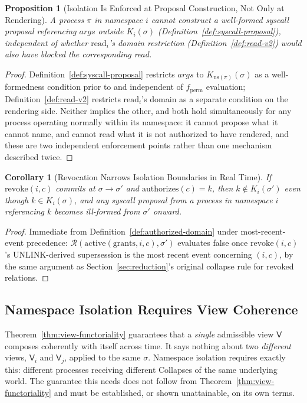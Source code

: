\documentclass[11pt]{article}
\newtheorem{proposition}{Proposition}[section]
\newtheorem{corollary}{Corollary}[section]
\begin{document}
\begin{proposition}[Isolation Is Enforced at Proposal Construction, Not Only at Rendering]
\label{prop:isolation-double-enforced}
A process $\pi$ in namespace $i$ cannot construct a well-formed syscall proposal referencing $\mathit{args}$ outside $K_i(\sigma)$ (Definition~\ref{def:syscall-proposal}), independent of whether $\mathrm{read}_i$'s domain restriction (Definition~\ref{def:read-v2}) would also have blocked the corresponding read.
\end{proposition}
\begin{proof}
Definition~\ref{def:syscall-proposal} restricts $\mathit{args}$ to $K_{\mathrm{ns}(\pi)}(\sigma)$ as a well-formedness condition prior to and independent of $f_{\mathrm{perm}}$ evaluation; Definition~\ref{def:read-v2} restricts $\mathrm{read}_i$'s domain as a separate condition on the rendering side. Neither implies the other, and both hold simultaneously for any process operating normally within its namespace: it cannot propose what it cannot name, and cannot read what it is not authorized to have rendered, and these are two independent enforcement points rather than one mechanism described twice.
\end{proof}

\begin{corollary}[Revocation Narrows Isolation Boundaries in Real Time]
\label{cor:revocation-narrows}
If $\mathrm{revoke}(i,c)$ commits at $\sigma \to \sigma'$ and $\mathrm{authorizes}(c) = k$, then $k \notin K_i(\sigma')$ even though $k \in K_i(\sigma)$, and any syscall proposal from a process in namespace $i$ referencing $k$ becomes ill-formed from $\sigma'$ onward.
\end{corollary}
\begin{proof}
Immediate from Definition~\ref{def:authorized-domain} under most-recent-event precedence: $\mathcal{R}(\mathrm{active}(\mathrm{grants},i,c),\sigma')$ evaluates false once $\mathrm{revoke}(i,c)$'s $\mathrm{UNLINK}$-derived supersession is the most recent event concerning $(i,c)$, by the same argument as Section~\ref{sec:reduction}'s original collapse rule for revoked relations.
\end{proof}

\subsection{Namespace Isolation Requires View Coherence}
\label{sec:namespace-coherence}

Theorem~\ref{thm:view-functoriality} guarantees that a \emph{single} admissible view $\mathsf{V}$ composes coherently with itself across time. It says nothing about two \emph{different} views, $\mathsf{V}_i$ and $\mathsf{V}_j$, applied to the same $\sigma$. Namespace isolation requires exactly this: different processes receiving different Collapses of the same underlying world. The guarantee this needs does not follow from Theorem~\ref{thm:view-functoriality} and must be established, or shown unattainable, on its own terms.
\end{document}
